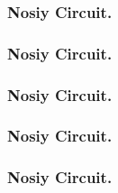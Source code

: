 \documentclass{beamer}
\begin{document}
\newcommand\DECSLIDE[2]{
\begin{frame}
\frametitle{Nosiy Circuit.}
  
\end{frame}
}


\DECSLIDE{test_test_correction_all_major_2_8-20_30x4.svg}{ Majoritiy }
\DECSLIDE{test_test_correction_by_colors_2_8-20_30x4.svg}{ Colors }
\DECSLIDE{test_test_correction_rand_2_8-20_30x4.svg}{ Picking Random }
\DECSLIDE{test_test_correction_by_SWIFT_2_8-20_30x4.svg}{ SWIFT }
\DECSLIDE{test_test_correction_by_MAX_2_8-20_30x4.svg}{ Max Color }


%
%
%
\end{document}
